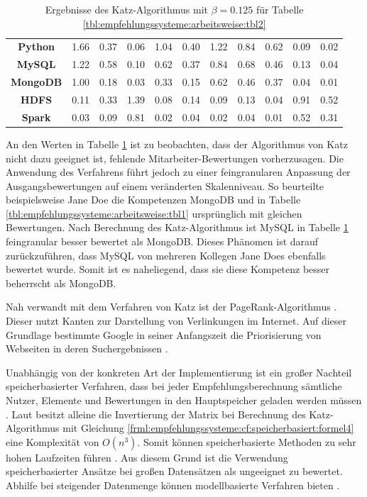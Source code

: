 \begin{table}[h]
\begin{tabular}{c|c|c|c|c|c|c|c|c|c|c}
		\textbf{Python}   & 1.66 & 0.37 & 0.06 & 1.04 & 0.40 & 1.22 & 0.84 & 0.62 & 0.09 & 0.02\\
		\textbf{MySQL}    & 1.22 & 0.58 & 0.10 & 0.62 & 0.37 & 0.84 & 0.68 & 0.46 & 0.13 & 0.04\\
		\textbf{MongoDB}  & 1.00 & 0.18 & 0.03 & 0.33 & 0.15 & 0.62 & 0.46 & 0.37 & 0.04 & 0.01\\
		\textbf{HDFS}     & 0.11 & 0.33 & 1.39 & 0.08 & 0.14 & 0.09 & 0.13 & 0.04 & 0.91 & 0.52\\
		\textbf{Spark}    & 0.03 & 0.09 & 0.81 & 0.02 & 0.04 & 0.02 & 0.04 & 0.01 & 0.52 & 0.31
	\end{tabular}
	\caption{Ergebnisse des Katz-Algorithmus mit $\beta = 0.125$ für Tabelle \ref{tbl:empfehlungssysteme:arbeitsweise:tbl2}}
	\label{tbl:empfehlungssysteme:arbeitsweise:tbl3}
\end{table}
\newpage
An den Werten in Tabelle \ref{tbl:empfehlungssysteme:arbeitsweise:tbl3} ist zu beobachten, dass der Algorithmus von Katz nicht dazu geeignet ist, fehlende Mitarbeiter-Bewertungen vorherzusagen. Die Anwendung des Verfahrens führt jedoch zu einer feingranularen Anpassung der Ausgangsbewertungen auf einem veränderten Skalenniveau. So beurteilte beispielsweise Jane Doe die Kompetenzen MongoDB und  in Tabelle \ref{tbl:empfehlungssysteme:arbeitsweise:tbl1} ursprünglich mit gleichen Bewertungen. Nach Berechnung des Katz-Algorithmus ist MySQL in Tabelle \ref{tbl:empfehlungssysteme:arbeitsweise:tbl3} feingranular besser bewertet als MongoDB. Dieses Phänomen ist darauf zurückzuführen, dass MySQL von mehreren Kollegen Jane Does ebenfalls bewertet wurde. Somit ist es naheliegend, dass sie diese Kompetenz besser beherrscht als MongoDB.

Nah verwandt mit dem Verfahren von Katz ist der PageRank-Algorithmus \cite[S. 1]{was:2018}. Dieser nutzt Kanten zur Darstellung von Verlinkungen im Internet. Auf dieser Grundlage bestimmte Google in seiner Anfangszeit die Priorisierung von Webseiten in deren Suchergebnissen \cite[S. 3ff.]{page:1999}.

Unabhängig von der konkreten Art der Implementierung ist ein großer Nachteil speicherbasierter Verfahren, dass bei jeder Empfehlungsberechnung sämtliche Nutzer, Elemente und Bewertungen in den Hauptspeicher geladen werden müssen \cite[S. 8]{yang:2016}. Laut \textcite[S. 3]{landherr:2010} besitzt alleine die Invertierung der Matrix bei Berechnung des Katz-Algorithmus mit Gleichung \ref{frml:empfehlungssysteme:cf:speicherbasiert:formel4} eine Komplexität von $O(n^3)$. Somit können speicherbasierte Methoden zu sehr hohen Laufzeiten führen \cite[S. 2]{zhang:2010}. Aus diesem Grund ist die Verwendung speicherbasierter Ansätze bei großen Datensätzen als ungeeignet zu bewertet. Abhilfe bei steigender Datenmenge können modellbasierte Verfahren bieten \cite[S. 8]{yang:2016}.

